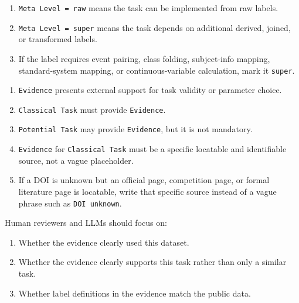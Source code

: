 \begin{tcolorbox}
\smallskip{}\par\smallskip

\begin{enumerate}[leftmargin=1.5em,noitemsep,topsep=2pt]
\item \texttt{Meta Level = raw} means the task can be implemented from raw labels.
\item \texttt{Meta Level = super} means the task depends on additional derived, joined, or transformed labels.
\item If the label requires event pairing, class folding, subject-info mapping, standard-system mapping, or continuous-variable calculation, mark it \texttt{super}.
\end{enumerate}

\smallskip{}\par\smallskip

\begin{enumerate}[leftmargin=1.5em,noitemsep,topsep=2pt]
\item \texttt{Evidence} presents external support for task validity or parameter choice.
\item \texttt{Classical Task} must provide \texttt{Evidence}.
\item \texttt{Potential Task} may provide \texttt{Evidence}, but it is not mandatory.
\item \texttt{Evidence} for \texttt{Classical Task} must be a specific locatable and identifiable source, not a vague placeholder.
\item If a DOI is unknown but an official page, competition page, or formal literature page is locatable, write that specific source instead of a vague phrase such as \texttt{DOI unknown}.
\end{enumerate}

\smallskip{}\par\smallskip

\noindent Human reviewers and LLMs should focus on:\par\smallskip

\begin{enumerate}[leftmargin=1.5em,noitemsep,topsep=2pt]
\item Whether the evidence clearly used this dataset.
\item Whether the evidence clearly supports this task rather than only a similar task.
\item Whether label definitions in the evidence match the public data.
\end{enumerate}


\end{tcolorbox}
